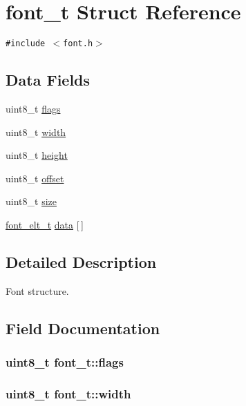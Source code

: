 \hypertarget{structfont__t}{
\section{font\_\-t Struct Reference}
\label{structfont__t}
}
{\tt \#include $<$font.h$>$}

\subsection*{Data Fields}
\begin{CompactItemize}
\item 
uint8\_\-t \hyperlink{structfont__t_dceac48a8d3885edb0603977c6795308}{flags}
\item 
uint8\_\-t \hyperlink{structfont__t_f85d1cb7f0c34161094903d271ad97f4}{width}
\item 
uint8\_\-t \hyperlink{structfont__t_5613f47d91a4c41070f30b5b12823186}{height}
\item 
uint8\_\-t \hyperlink{structfont__t_09ac4f1f9af22ab61ec68515d195c2b2}{offset}
\item 
uint8\_\-t \hyperlink{structfont__t_bfce293635a0db6101751ca09c5b4e36}{size}
\item 
\hyperlink{font_8h_ebe862abd5c1acb221d1b0567c7b86f6}{font\_\-elt\_\-t} \hyperlink{structfont__t_a41cff431bd2bdba7ac28e21b564beb6}{data} \mbox{[}$\,$\mbox{]}
\end{CompactItemize}


\subsection{Detailed Description}
Font structure. 

\subsection{Field Documentation}
\hypertarget{structfont__t_dceac48a8d3885edb0603977c6795308}{
\subsubsection{\setlength{\rightskip}{0pt plus 5cm}uint8\_\-t {\bf font\_\-t::flags}}}
\label{structfont__t_dceac48a8d3885edb0603977c6795308}


\hypertarget{structfont__t_f85d1cb7f0c34161094903d271ad97f4}{
\subsubsection{\setlength{\rightskip}{0pt plus 5cm}uint8\_\-t {\bf font\_\-t::width}}}
\label{structfont__t_f85d1cb7f0c34161094903d271ad97f4}




